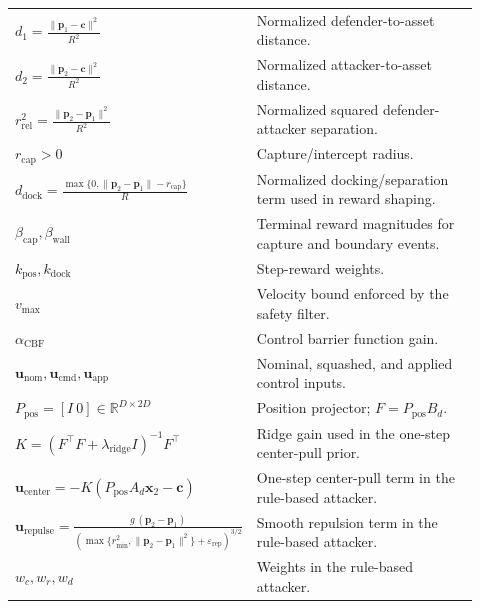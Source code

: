 \begin{longtable}{>{\raggedright\arraybackslash}p{0.42\linewidth}
                  >{\raggedright\arraybackslash}p{0.50\linewidth}}
\(d_1=\tfrac{\|\mathbf{p}_1-\mathbf{c}\|^2}{R^2}\) & Normalized defender-to-asset distance.\\
\(d_2=\tfrac{\|\mathbf{p}_2-\mathbf{c}\|^2}{R^2}\) & Normalized attacker-to-asset distance.\\
\(r_{\mathrm{rel}}^2=\tfrac{\|\mathbf{p}_2-\mathbf{p}_1\|^2}{R^2}\) & Normalized squared defender-attacker separation.\\
\(r_{\mathrm{cap}}>0\) & Capture/intercept radius.\\
\(d_{\mathrm{dock}}=\tfrac{\max\{0,\|\mathbf{p}_2-\mathbf{p}_1\|-r_{\mathrm{cap}}\}}{R}\) & Normalized docking/separation term used in reward shaping.\\
\(\beta_{\mathrm{cap}},\beta_{\mathrm{wall}}\) & Terminal reward magnitudes for capture and boundary events.\\
\(k_{\mathrm{pos}},k_{\mathrm{dock}}\) & Step-reward weights.\\[2pt]

\(v_{\max}\) & Velocity bound enforced by the safety filter.\\
\(\alpha_{\mathrm{CBF}}\) & Control barrier function gain.\\
\(\mathbf{u}_{\mathrm{nom}},\mathbf{u}_{\mathrm{cmd}},\mathbf{u}_{\mathrm{app}}\) & Nominal, squashed, and applied control inputs.\\
\(P_{\mathrm{pos}}=[I~0]\in\mathbb{R}^{D\times 2D}\) & Position projector; \(F=P_{\mathrm{pos}}B_d\).\\
\(K=(F^\top F+\lambda_{\mathrm{ridge}} I)^{-1}F^\top\) & Ridge gain used in the one-step center-pull prior.\\
\(\mathbf{u}_{\mathrm{center}}=-K(P_{\mathrm{pos}}A_d\mathbf{x}_2-\mathbf{c})\) & One-step center-pull term in the rule-based attacker.\\
\(\mathbf{u}_{\mathrm{repulse}}=\tfrac{g\,(\mathbf{p}_2-\mathbf{p}_1)}{(\max\{r_{\min}^2,\|\mathbf{p}_2-\mathbf{p}_1\|^2\}+\varepsilon_{\mathrm{rep}})^{3/2}}\) & Smooth repulsion term in the rule-based attacker.\\
\(w_c,w_r,w_d\) & Weights in the rule-based attacker.\\[2pt]


\end{longtable}
